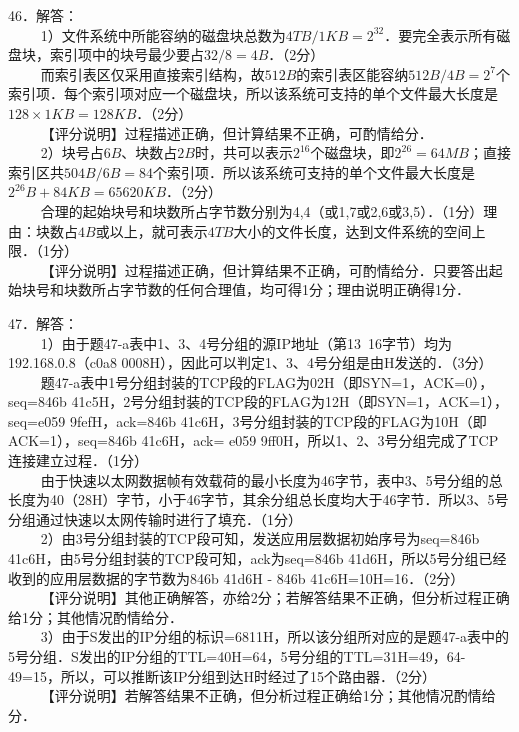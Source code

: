 46．解答： \\
$\qquad$ 1）文件系统中所能容纳的磁盘块总数为$4TB/1KB=2^{32}$．要完全表示所有磁盘块，索引项中的块号最少要占$32/8=4B$．（2分） \\
$\qquad$ 而索引表区仅采用直接索引结构，故$512B$的索引表区能容纳$512B/4B=2^7$个索引项．每个索引项对应一个磁盘块，所以该系统可支持的单个文件最大长度是$128\times1KB=128KB$．（2分） \\
$\qquad$ 【评分说明】过程描述正确，但计算结果不正确，可酌情给分． \\
$\qquad$ 2）块号占$6B$、块数占$2B$时，共可以表示$2^{16}$个磁盘块，即$2^{26}=64MB$；直接索引区共$504B/6B=84$个索引项．所以该系统可支持的单个文件最大长度是$2^{26}B+84KB=65620KB$．（2分） \\
$\qquad$ 合理的起始块号和块数所占字节数分别为4,4（或1,7或2,6或3,5）．（1分）理由：块数占$4B$或以上，就可表示$4TB$大小的文件长度，达到文件系统的空间上限．（1分） \\
$\qquad$ 【评分说明】过程描述正确，但计算结果不正确，可酌情给分．只要答出起始块号和块数所占字节数的任何合理值，均可得1分；理由说明正确得1分．

47．解答： \\
$\qquad$ 1）由于题47-a表中1、3、4号分组的源IP地址（第13~16字节）均为192.168.0.8（c0a8 0008H），因此可以判定1、3、4号分组是由H发送的．（3分） \\
$\qquad$ 题47-a表中1号分组封装的TCP段的FLAG为02H（即SYN=1，ACK=0），seq=846b 41c5H，2号分组封装的TCP段的FLAG为12H（即SYN=1，ACK=1），seq=e059 9fefH，ack=846b 41c6H，3号分组封装的TCP段的FLAG为10H（即ACK=1），seq=846b 41c6H，ack= e059 9ff0H，所以1、2、3号分组完成了TCP连接建立过程．（1分） \\
$\qquad$ 由于快速以太网数据帧有效载荷的最小长度为46字节，表中3、5号分组的总长度为40（28H）字节，小于46字节，其余分组总长度均大于46字节．所以3、5号分组通过快速以太网传输时进行了填充．（1分） \\
$\qquad$ 2）由3号分组封装的TCP段可知，发送应用层数据初始序号为seq=846b 41c6H，由5号分组封装的TCP段可知，ack为seq=846b 41d6H，所以5号分组已经收到的应用层数据的字节数为846b 41d6H - 846b 41c6H=10H=16．（2分） \\
$\qquad$ 【评分说明】其他正确解答，亦给2分；若解答结果不正确，但分析过程正确给1分；其他情况酌情给分． \\
$\qquad$ 3）由于S发出的IP分组的标识=6811H，所以该分组所对应的是题47-a表中的5号分组．S发出的IP分组的TTL=40H=64，5号分组的TTL=31H=49，64-49=15，所以，可以推断该IP分组到达H时经过了15个路由器．（2分） \\
$\qquad$ 【评分说明】若解答结果不正确，但分析过程正确给1分；其他情况酌情给分．